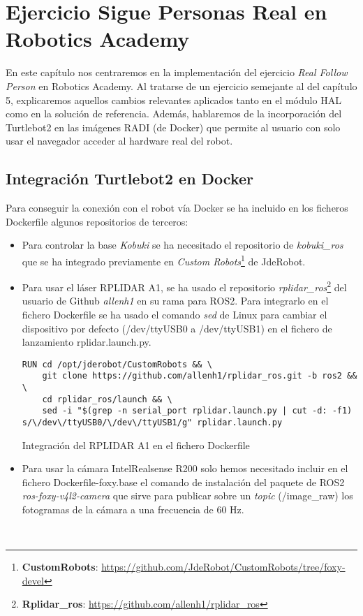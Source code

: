 \chapter{Ejercicio Sigue Personas Real en Robotics Academy}
\label{cap:capitulo6}

En este capítulo nos centraremos en la implementación del ejercicio \textit{Real Follow Person} en Robotics Academy. Al tratarse de un ejercicio semejante al del capítulo 5, explicaremos aquellos cambios relevantes aplicados tanto en el módulo HAL como en la solución de referencia. Además, hablaremos de la incorporación del Turtlebot2 en las imágenes RADI (de Docker) que permite al usuario con solo usar el navegador acceder al hardware real del robot.\\




\section{Integración Turtlebot2 en Docker}
\label{sec:integracion_turtlebot2_docker}

Para conseguir la conexión con el robot vía Docker se ha incluido en los ficheros Dockerfile algunos repositorios de terceros:

\begin{itemize}
	\item Para controlar la base \textit{Kobuki} se ha necesitado el repositorio de \textit{kobuki\_ros} que se ha integrado previamente en \textit{Custom Robots}\footnote{\textbf{CustomRobots}: \url{https://github.com/JdeRobot/CustomRobots/tree/foxy-devel}} de JdeRobot.
	
	\item Para usar el láser RPLIDAR A1, se ha usado el repositorio \textit{rplidar\_ros}\footnote{\textbf{Rplidar\_ros}: \url{https://github.com/allenh1/rplidar_ros}} del usuario de Github \textit{allenh1} en su rama para ROS2. Para integrarlo en el fichero Dockerfile se ha usado el comando \textit{sed} de Linux para cambiar el dispositivo por defecto (/dev/ttyUSB0 a /dev/ttyUSB1) en el fichero de lanzamiento rplidar.launch.py.
\begin{code}[H]
\begin{lstlisting}
RUN cd /opt/jderobot/CustomRobots && \
	git clone https://github.com/allenh1/rplidar_ros.git -b ros2 && \
	cd rplidar_ros/launch && \
	sed -i "$(grep -n serial_port rplidar.launch.py | cut -d: -f1) s/\/dev\/ttyUSB0/\/dev\/ttyUSB1/g" rplidar.launch.py
\end{lstlisting}
\caption{Integración del RPLIDAR A1 en el fichero Dockerfile}
\label{cod:rplidar_dockerfile}
\end{code}

	\item Para usar la cámara IntelRealsense R200 solo hemos necesitado incluir en el fichero Dockerfile-foxy.base el comando de instalación del paquete de ROS2 \textit{ros-foxy-v4l2-camera} que sirve para publicar sobre un \textit{topic} (/image\_raw) los fotogramas de la cámara a una frecuencia de 60 Hz.
\end{itemize}\

